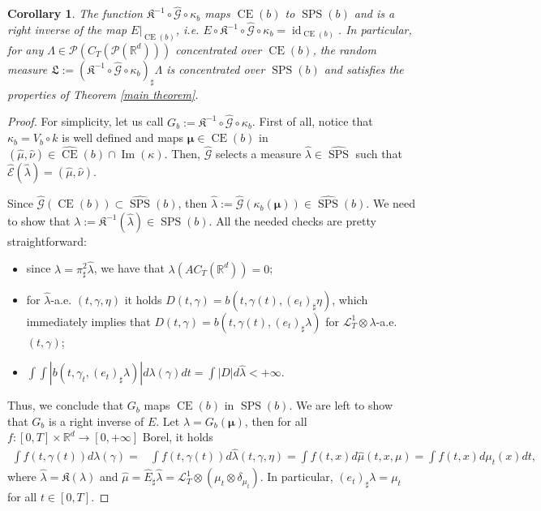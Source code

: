 \documentclass[10pt,leqno]{amsart}
\numberwithin{equation}{section}
\newtheorem{co}[teorema]{Corollary}
\newcommand{\R}{\mathbb{R}}
\newcommand{\PP}{\mathcal{P}}
\begin{document}
\begin{co}
    The function $\mathfrak{K}^{-1} \circ \hat{\mathcal{G}} \circ \kappa_b$ maps $\operatorname{CE}(b)$ to $\operatorname{SPS}(b)$ and is a right inverse of the map  $E|_{\operatorname{CE}(b)}$, i.e. $E\circ \mathfrak{K}^{-1} \circ \hat{\mathcal{G}} \circ \kappa_b = \operatorname{id}_{\operatorname{CE}(b)}$. In particular, for any $\Lambda \in \PP(C_T(\PP(\R^d)))$ concentrated over $\operatorname{CE}(b)$, the random measure $\mathfrak{L}:= (\mathfrak{K}^{-1} \circ \hat{\mathcal{G}} \circ \kappa_b)_\sharp \Lambda$ is concentrated over $\operatorname{SPS}(b)$ and satisfies the properties of Theorem \ref{main theorem}.
\end{co}

\begin{proof}
For simplicity, let us call $G_b:= \mathfrak{K}^{-1} \circ \hat{\mathcal{G}} \circ \kappa_b$.
    First of all, notice that $\kappa_b = V_b \circ k$ is well defined and maps $\boldsymbol{\mu} \in\operatorname{CE}(b)$ in $(\hat{\mu},\hat{\nu}) \in \hat{\operatorname{CE}}(b) \cap \operatorname{Im}(\kappa)$. Then, $\hat{\mathcal{G}}$ selects a measure $\hat{\lambda} \in \hat{\operatorname{SPS}}$ such that $\hat{\mathcal{E}}(\hat{\lambda}) = (\hat{\mu},\hat{\nu})$. 
    
    Since $\hat{\mathcal{G}}(\operatorname{CE}(b)) \subset \hat{\operatorname{SPS}}(b)$, then $\hat{\lambda} :=\hat{\mathcal{G}}(\kappa_b(\boldsymbol{\mu})) \in \hat{\operatorname{SPS}}(b)$. We need to show that $\lambda := \mathfrak{K}^{-1}(\hat{\lambda}) \in \operatorname{SPS}(b)$. All the needed checks are pretty straightforward: 
    \begin{itemize}
        \item since $\lambda = \pi^2_\sharp \hat{\lambda}$, we have that $\lambda(AC_T(\R^d)) = 0$;
        \item for $\hat{\lambda}$-a.e. $(t,\gamma,\eta)$ it holds $D(t,\gamma) = b(t,\gamma(t),(e_t)_\sharp \eta)$, which immediately implies that $D(t,\gamma) = b(t,\gamma(t),(e_t)_\sharp \lambda)$ for $\mathcal{L}^1_T\otimes \lambda$-a.e. $(t,\gamma)$;
        \item $\int \int |b(t,\gamma_t,(e_t)_\sharp \lambda)| d\lambda(\gamma) dt = \int |D| d\hat{\lambda}<+\infty$.
    \end{itemize}
    Thus, we conclude that $G_b$ maps $\operatorname{CE}(b)$ in $\operatorname{SPS}(b)$. 
    We are left to show that $G_b$ is a right inverse of $E$. Let $\lambda = G_b(\boldsymbol{\mu})$, then for all $f:[0,T]\times\R^d \to [0,+\infty]$ Borel, it holds
    \begin{align*}
        \int f(t,\gamma(t)) d\lambda(\gamma) = & \int f(t,\gamma(t)) d\hat{\lambda}(t,\gamma,\eta)
        = 
        \int f(t,x) d\hat{\mu}(t,x,\mu) 
        = 
        \int f(t,x) d\mu_t(x) dt,
    \end{align*}
    where $\hat{\lambda} = \mathfrak{K}(\lambda)$ and $\hat{\mu} = \hat{E}_\sharp \hat{\lambda} = \mathcal{L}^1_T\otimes (\mu_t\otimes \delta_{\mu_t})$. In particular, $(e_t)_\sharp \lambda = \mu_t$ for all $t\in[0,T]$.
\end{proof}
\end{document}
